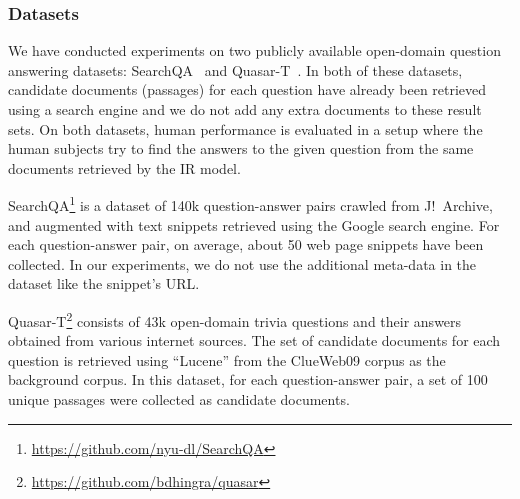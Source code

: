 \subsubsection{Datasets}
We have conducted experiments on two publicly available open-domain question answering datasets: SearchQA~\citep{dunn2017searchqa} and Quasar-T~\citep{dhingra2017quasar}. 
In both of these datasets, candidate documents (passages) for each question have already been retrieved using a search engine and we do not add any extra documents to these result sets. 
On both datasets, human performance is evaluated in a setup where the human subjects try to find the answers to the given question from the same documents retrieved by the IR model.

SearchQA\footnote{\url{https://github.com/nyu-dl/SearchQA}} is a dataset of 140k question-answer pairs crawled from J!\ Archive, and augmented with text snippets retrieved using the Google search engine. 
For each question-answer pair, on average, about 50 web page snippets have been collected. 
In our experiments, we do not use the additional meta-data in the dataset like the snippet's URL.

Quasar-T\footnote{\url{https://github.com/bdhingra/quasar}} consists of 43k open-domain trivia questions and their answers obtained from various internet sources. 
The set of candidate documents for each question is retrieved using ``Lucene'' from the ClueWeb09 corpus as the background corpus. 
In this dataset, for each question-answer pair, a set of 100 unique passages were collected as candidate documents.

